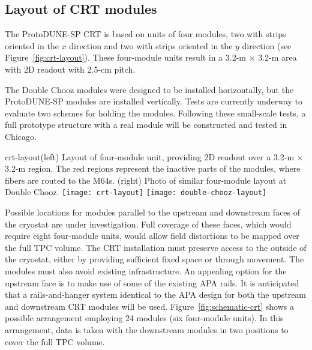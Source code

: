 \subsection{Layout of CRT modules}

The ProtoDUNE-SP CRT is based on units of four modules, two with strips oriented in the $x$ direction and two with strips oriented in the $y$ direction (see Figure~\ref{fig:crt-layout}). These four-module units result in a 3.2-m $\times$ 3.2-m area with 2D readout with 2.5-cm pitch.

The Double Chooz modules were designed to be installed horizontally, but the ProtoDUNE-SP modules are installed vertically. Tests are currently underway to evaluate two schemes for holding the modules. Following these small-scale tests, a full prototype structure with a real module will be constructed and tested in Chicago.

\begin{cdrfigure}{crt-layout}{(left) Layout of four-module unit, providing 2D readout over a 3.2-m $\times$ 3.2-m region. The red regions represent the inactive parts of the modules, where fibers are routed to the M64s. (right) Photo of similar four-module layout at Double Chooz.}
  \texttt{[image: crt-layout]}
  \texttt{[image: double-chooz-layout]}
\end{cdrfigure}

Possible locations for modules parallel to the upstream and downstream faces of the cryostat are under investigation. %
Full coverage of these faces, which would require eight four-module units, would allow field distortions to be mapped over the full TPC volume. 
The CRT installation must preserve access to the outside of the cryostat, either by providing sufficient fixed space or through movement. 
The modules must also avoid existing infrastructure. An appealing option for the upstream face is to make use of some of the existing APA rails. It is anticipated that a rails-and-hanger system identical to the APA design for both the upstream and downstream CRT modules will be used. Figure~\ref{fig:schematic-crt} shows a possible arrangement employing 24 modules (six four-module units). In this arrangement, data is taken with the downstream modules in two positions to cover the full TPC volume.

